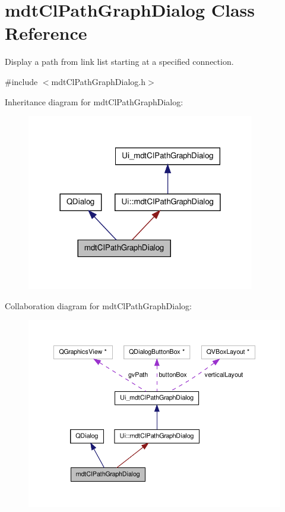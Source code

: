 \hypertarget{classmdt_cl_path_graph_dialog}{\section{mdt\-Cl\-Path\-Graph\-Dialog Class Reference}
\label{classmdt_cl_path_graph_dialog}
}


Display a path from link list starting at a specified connection.  




{\ttfamily \#include $<$mdt\-Cl\-Path\-Graph\-Dialog.\-h$>$}



Inheritance diagram for mdt\-Cl\-Path\-Graph\-Dialog\-:\nopagebreak
\begin{figure}[H]
\begin{center}
\leavevmode
\includegraphics[width=282pt]{classmdt_cl_path_graph_dialog__inherit__graph}
\end{center}
\end{figure}


Collaboration diagram for mdt\-Cl\-Path\-Graph\-Dialog\-:\nopagebreak
\begin{figure}[H]
\begin{center}
\leavevmode
\includegraphics[width=350pt]{classmdt_cl_path_graph_dialog__coll__graph}
\end{center}
\end{figure}
